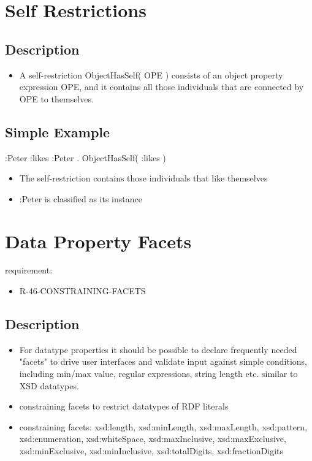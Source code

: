 \documentclass{llncs}
\newcommand{\tb}[1]{\todo[size=\small, color=blue!40]{\textbf{Thomas:} #1}}
\begin{document}
\tb{ToDo: DL}

\section{Self Restrictions}

\subsection{Description}

\begin{itemize}
	\item A self-restriction ObjectHasSelf( OPE ) consists of an object property expression OPE, and it contains all those individuals that are connected by OPE to themselves. 
\end{itemize}

\subsection{Simple Example}

\begin{ex}
:Peter :likes :Peter . 
ObjectHasSelf( :likes ) 
\end{ex}

\begin{itemize}
	\item The self-restriction contains those individuals that like themselves
  \item :Peter is classified as its instance
\end{itemize}

\section{Data Property Facets}

requirement:

\begin{itemize}
	\item R-46-CONSTRAINING-FACETS
\end{itemize}

\subsection{Description}

\begin{itemize}
  \item For datatype properties it should be possible to declare frequently needed "facets" to drive user interfaces and validate input against simple conditions, including min/max value, regular expressions, string length etc. similar to XSD datatypes. 
	\item constraining facets to restrict datatypes of RDF literals
  \item constraining facets: xsd:length, xsd:minLength, xsd:maxLength, xsd:pattern, xsd:enumeration, xsd:whiteSpace, xsd:maxInclusive, xsd:maxExclusive, xsd:minExclusive, xsd:minInclusive, xsd:totalDigits, xsd:fractionDigits

\end{itemize}
\end{document}
